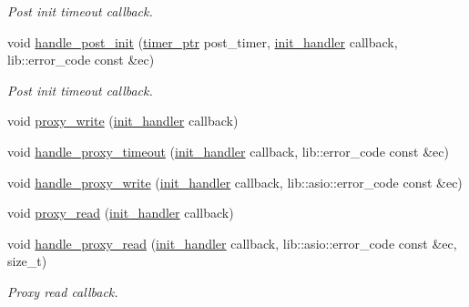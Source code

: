 \begin{DoxyCompactItemize}
\begin{DoxyCompactList}\small\item\em Post init timeout callback. \end{DoxyCompactList}\item 
void \hyperlink{classwebsocketpp_1_1transport_1_1asio_1_1connection_a6782049b9d8b324d85da34dd9e426950}{handle\+\_\+post\+\_\+init} (\hyperlink{classwebsocketpp_1_1transport_1_1asio_1_1connection_a96d8a6cd5cf1120208b206da109a194e}{timer\+\_\+ptr} post\+\_\+timer, \hyperlink{namespacewebsocketpp_1_1transport_aeae75e675c1a334b3b33ab7120b480a5}{init\+\_\+handler} callback, lib\+::error\+\_\+code const \&ec)
\begin{DoxyCompactList}\small\item\em Post init timeout callback. \end{DoxyCompactList}\item 
void \hyperlink{classwebsocketpp_1_1transport_1_1asio_1_1connection_a55e3fac0ec05389d6765a6496922f099}{proxy\+\_\+write} (\hyperlink{namespacewebsocketpp_1_1transport_aeae75e675c1a334b3b33ab7120b480a5}{init\+\_\+handler} callback)
\item 
void \hyperlink{classwebsocketpp_1_1transport_1_1asio_1_1connection_a5bf6d19bdada66f4880182f632fe88e0}{handle\+\_\+proxy\+\_\+timeout} (\hyperlink{namespacewebsocketpp_1_1transport_aeae75e675c1a334b3b33ab7120b480a5}{init\+\_\+handler} callback, lib\+::error\+\_\+code const \&ec)
\item 
void \hyperlink{classwebsocketpp_1_1transport_1_1asio_1_1connection_a5684daf9e8ee3e0447694d4376832917}{handle\+\_\+proxy\+\_\+write} (\hyperlink{namespacewebsocketpp_1_1transport_aeae75e675c1a334b3b33ab7120b480a5}{init\+\_\+handler} callback, lib\+::asio\+::error\+\_\+code const \&ec)
\item 
void \hyperlink{classwebsocketpp_1_1transport_1_1asio_1_1connection_a37efcf4f20e4291bb62174cdd4093730}{proxy\+\_\+read} (\hyperlink{namespacewebsocketpp_1_1transport_aeae75e675c1a334b3b33ab7120b480a5}{init\+\_\+handler} callback)
\item 
void \hyperlink{classwebsocketpp_1_1transport_1_1asio_1_1connection_abb5b33cf14e1f84aa5997e1fe8bffa0e}{handle\+\_\+proxy\+\_\+read} (\hyperlink{namespacewebsocketpp_1_1transport_aeae75e675c1a334b3b33ab7120b480a5}{init\+\_\+handler} callback, lib\+::asio\+::error\+\_\+code const \&ec, size\+\_\+t)
\begin{DoxyCompactList}\small\item\em Proxy read callback. \end{DoxyCompactList}\item 

\end{DoxyCompactItemize}
